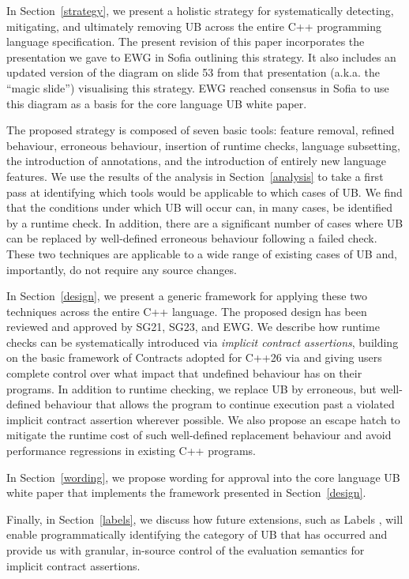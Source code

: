In Section~\ref{strategy}, we present a holistic strategy for systematically detecting, mitigating, and ultimately removing UB across the entire C++ programming language specification. The present revision of this paper incorporates the presentation \cite{P3754R0} we gave to EWG in Sofia outlining this strategy. It also includes an updated version of the diagram on slide 53 from that presentation (a.k.a. the ``magic slide'') visualising this strategy. EWG reached consensus in Sofia to use this diagram as a basis for the core language UB white paper.

The proposed strategy is composed of seven basic tools: feature removal, refined behaviour, erroneous behaviour, insertion of runtime checks, language subsetting, the introduction of annotations, and the introduction of entirely new language features. We use the results of the analysis in Section~\ref{analysis} to take a first pass at identifying which tools would be applicable to which cases of UB. We find that the conditions under which UB will occur can, in many cases, be identified by a runtime check. In addition, there are a significant number of cases where UB can be replaced by well-defined erroneous behaviour following a failed check. These two techniques are applicable to a wide range of existing cases of UB and, importantly, do not require any source changes.

In Section~\ref{design}, we present a generic framework for applying these two techniques across the entire C++ language. The proposed design has been reviewed and approved by SG21, SG23, and EWG. We describe how runtime checks can be systematically introduced via \emph{implicit contract assertions}, building on the basic framework of Contracts adopted for C++26 via \cite{P2900R14} and giving users complete control over what impact that undefined behaviour has on their programs. In addition to runtime checking, we replace UB by erroneous, but well-defined behaviour that allows the program to continue execution past a violated implicit contract assertion wherever possible. We also propose an escape hatch to mitigate the runtime cost of such well-defined replacement behaviour and avoid performance regressions in existing C++ programs.

In Section~\ref{wording}, we propose wording for approval into the core language UB white paper \cite{P3656R1} that implements the framework presented in Section~\ref{design}.

Finally, in Section~\ref{labels}, we discuss how future extensions, such as Labels \cite{P3400R1},
will enable programmatically identifying the category of UB that has occurred and provide us with granular, in-source control of the evaluation semantics for implicit contract assertions.

